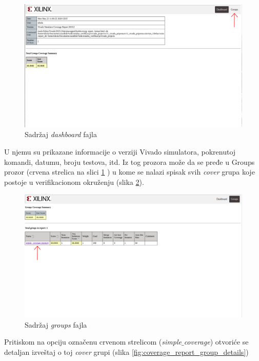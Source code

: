 \begin{figure}[h!]
  \center
  \includegraphics[width=150mm, scale=0.5]{img/v11_coverage_report_dashboard.png}
  \caption{Sadržaj \emph{dashboard }fajla}
  \label{fig:coverage_report_dashboard}
\end{figure}


U njemu su prikazane informacije o verziji Vivado simulatora, pokrenutoj komandi, datumu, broju testova, itd. Iz tog prozora
može da se pređe u Groups prozor (crvena strelica na slici \ref{fig:coverage_report_dashboard} ) u kome se nalazi spisak svih \emph{cover} grupa koje postoje
u verifikacionom okruženju (slika \ref{fig:coverage_report_groups}). 

\begin{figure}[h!]
  \center
  \includegraphics[width=150mm, scale=0.5]{img/v11_coverage_report_groups.png}
  \caption{Sadržaj \emph{groups} fajla}
  \label{fig:coverage_report_groups}
\end{figure}

Pritiskom na opciju označenu crvenom strelicom (\emph{simple\(\_\)coverage}) otvoriće se detaljan izveštaj o toj \emph{cover} grupi (slika \ref{fig:coverage_report_group_details})

